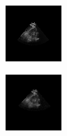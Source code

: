 \begin{figure}[htb]
        \begin{subfigure}[b]{0.245\textwidth}
                \centering
                \includegraphics[width=\linewidth]{img_seg/30_post}
        \end{subfigure}%
        \hspace{1px}
        \begin{subfigure}[b]{0.245\textwidth}
                \centering
                \includegraphics[width=\linewidth]{img_seg/32_post}

\end{subfigure}
\end{figure}
